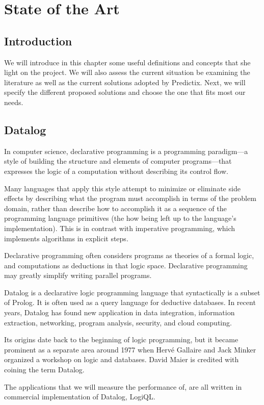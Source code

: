 \chapter{State of the Art}


\section*{Introduction}
We will introduce in this chapter some useful definitions and concepts that she
light on  the project. We will also assess the current situation be examining
the literature as well as the current solutions adopted by Predictix. Next, we
will specify the different proposed solutions and choose the one that fits most
our needs.
\pagebreak

\section{Datalog}
In computer science, declarative programming is a programming paradigm—a style
of building the structure and elements of computer programs—that expresses the
logic of a computation without describing its control flow.

Many languages that apply this style attempt to minimize or eliminate side
effects by describing what the program must accomplish in terms of the problem
domain, rather than describe how to accomplish it as a sequence of the
programming language primitives (the how being left up to the language's
implementation). This is in contrast with imperative programming, which
implements algorithms in explicit steps.

Declarative programming often considers programs as theories of a formal logic,
and computations as deductions in that logic space. Declarative programming may
greatly simplify writing parallel programs.

Datalog is a declarative logic programming language that syntactically is a
subset of Prolog. It is often used as a query language for deductive databases.
In recent years, Datalog has found new application in data integration,
information extraction, networking, program analysis, security, and cloud
computing.

Its origins date back to the beginning of logic programming, but it became
prominent as a separate area around 1977 when Hervé Gallaire and Jack Minker
organized a workshop on logic and databases. David Maier is credited with
coining the term Datalog.

The applications that we will measure the performance of, are all written in
commercial implementation of Datalog, LogiQL.

